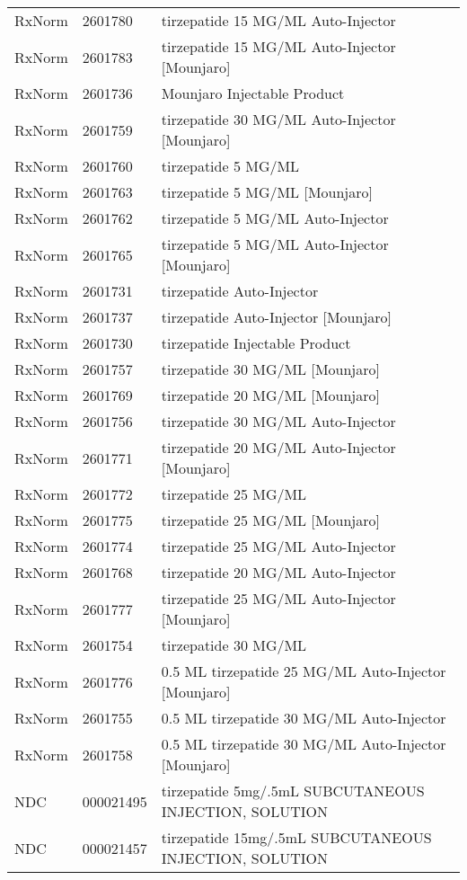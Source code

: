\begin{longtable}{p{}p{}p{}}
  RxNorm & 2601780 & tirzepatide 15 MG/ML Auto-Injector \\ 
  RxNorm & 2601783 & tirzepatide 15 MG/ML Auto-Injector [Mounjaro] \\ 
  RxNorm & 2601736 & Mounjaro Injectable Product \\ 
  RxNorm & 2601759 & tirzepatide 30 MG/ML Auto-Injector [Mounjaro] \\ 
  RxNorm & 2601760 & tirzepatide 5 MG/ML \\ 
  RxNorm & 2601763 & tirzepatide 5 MG/ML [Mounjaro] \\ 
  RxNorm & 2601762 & tirzepatide 5 MG/ML Auto-Injector \\ 
  RxNorm & 2601765 & tirzepatide 5 MG/ML Auto-Injector [Mounjaro] \\ 
  RxNorm & 2601731 & tirzepatide Auto-Injector \\ 
  RxNorm & 2601737 & tirzepatide Auto-Injector [Mounjaro] \\ 
  RxNorm & 2601730 & tirzepatide Injectable Product \\ 
  RxNorm & 2601757 & tirzepatide 30 MG/ML [Mounjaro] \\ 
  RxNorm & 2601769 & tirzepatide 20 MG/ML [Mounjaro] \\ 
  RxNorm & 2601756 & tirzepatide 30 MG/ML Auto-Injector \\ 
  RxNorm & 2601771 & tirzepatide 20 MG/ML Auto-Injector [Mounjaro] \\ 
  RxNorm & 2601772 & tirzepatide 25 MG/ML \\ 
  RxNorm & 2601775 & tirzepatide 25 MG/ML [Mounjaro] \\ 
  RxNorm & 2601774 & tirzepatide 25 MG/ML Auto-Injector \\ 
  RxNorm & 2601768 & tirzepatide 20 MG/ML Auto-Injector \\ 
  RxNorm & 2601777 & tirzepatide 25 MG/ML Auto-Injector [Mounjaro] \\ 
  RxNorm & 2601754 & tirzepatide 30 MG/ML \\ 
  RxNorm & 2601776 & 0.5 ML tirzepatide 25 MG/ML Auto-Injector [Mounjaro] \\ 
  RxNorm & 2601755 & 0.5 ML tirzepatide 30 MG/ML Auto-Injector \\ 
  RxNorm & 2601758 & 0.5 ML tirzepatide 30 MG/ML Auto-Injector [Mounjaro] \\ 
  NDC & 000021495 & tirzepatide 5mg/.5mL SUBCUTANEOUS INJECTION, SOLUTION \\ 
  NDC & 000021457 & tirzepatide 15mg/.5mL SUBCUTANEOUS INJECTION, SOLUTION \\ 

\end{longtable}
